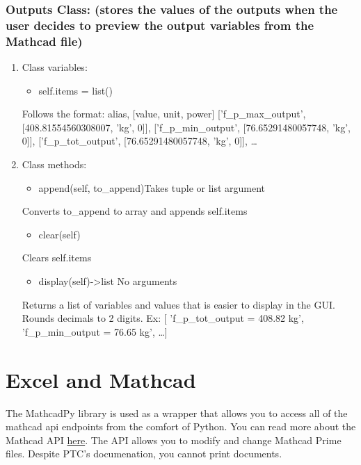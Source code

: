 \documentclass[11pt]{article}
\begin{document}
\subsubsection{Outputs Class: (stores the values of the outputs when the user decides to preview the output variables from the Mathcad file)}
\label{sec:org764de2d}
\begin{enumerate}
\item Class variables:
\label{sec:org0862717}

\begin{itemize}
\item self.items = list()
\end{itemize}
Follows the format:
alias, [value, unit, power]
['f\_p\_max\_output', [408.81554560308007, 'kg', 0]],
['f\_p\_min\_output', [76.65291480057748, 'kg', 0]],
['f\_p\_tot\_output', [76.65291480057748, 'kg', 0]],
\ldots{}
\item Class methods:
\label{sec:org29b754a}
\begin{itemize}
\item append(self, to\_append)Takes tuple or list argument
\end{itemize}
Converts to\_append to array and appends self.items

\begin{itemize}
\item clear(self)
\end{itemize}
Clears self.items

\begin{itemize}
\item display(self)->list No arguments
\end{itemize}
Returns a list of variables and values that is easier to display in the GUI. Rounds decimals to 2 digits.
Ex: [ 'f\_p\_tot\_output = 408.82 kg', 'f\_p\_min\_output = 76.65 kg', \ldots{}]
\end{enumerate}

\section{Excel and Mathcad}
\label{sec:org664bbe2}

The MathcadPy library is used as a wrapper that allows you to access all of the mathcad api endpoints from the comfort of Python. You can read more about the Mathcad API \href{https://support.ptc.com/help/mathcad/r7.0/en/index.html\#page/PTC\_Mathcad\_Help\%2Fmathcad\_and\_automation\_api.html\%23}{here}. The API allows you to modify and change Mathcad Prime files. Despite PTC's documenation, you cannot print documents.
\end{document}

